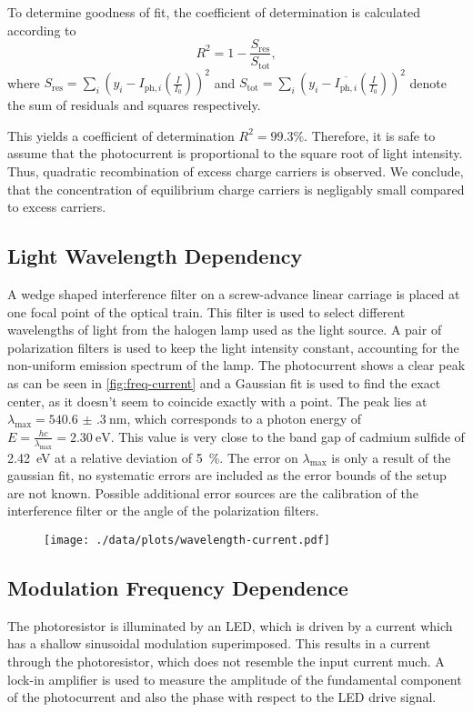 To determine goodness of fit, the coefficient of determination is calculated according to
\begin{equation*}
	R^2 = 1 - \frac{S_\text{res}}{S_\text{tot}},
\end{equation*}
where $S_\text{res}=\sum_i\left(y_i - I_{\text{ph},i}\left(\frac{I}{I_0}\right)\right)^2$ and $S_\text{tot}=\sum_i\left(y_i - \overline{I_{\text{ph},i}}\left(\frac{I}{I_0}\right)\right)^2$ denote the sum of residuals and squares respectively.

This yields a coefficient of determination $R^2 = 99.3\%$.
Therefore, it is safe to assume that the photocurrent is proportional to the square root of light intensity.
Thus, quadratic recombination of excess charge carriers is observed.
We conclude, that the concentration of equilibrium charge carriers is negligably small compared to excess carriers.

\subsection{Light Wavelength Dependency}
A wedge shaped interference filter on a screw-advance linear carriage is placed at one focal point of the optical train.
This filter is used to select different wavelengths of light from the halogen lamp used as the light source.
A pair of polarization filters is used to keep the light intensity constant, accounting for the non-uniform emission spectrum of the lamp.
The photocurrent shows a clear peak as can be seen in \autoref{fig:freq-current} and a Gaussian fit is used to find the exact center, as it doesn't seem to coincide exactly with a point.
The peak lies at $\lambda_\text{max} = \SI{540.6(3)}{\nano\meter}$, which corresponds to a photon energy of $E = \frac{h c}{\lambda_\text{max}} = \SI{2.30}{\electronvolt}$.
This value is very close to the band gap of cadmium sulfide of \SI{2.42}{\electronvolt} at a relative deviation of \SI{5}{\percent}.
The error on $\lambda_\text{max}$ is only a result of the gaussian fit, no systematic errors are included as the error bounds of the setup are not known.
Possible additional error sources are the calibration of the interference filter or the angle of the polarization filters.
\begin{figure}
	\centering
	\texttt{[image: ./data/plots/wavelength-current.pdf]}
	\label{fig:freq-current}
\end{figure}

\subsection{Modulation Frequency Dependence}
The photoresistor is illuminated by an LED, which is driven by a current which has a shallow sinusoidal modulation superimposed.
This results in a current through the photoresistor, which does not resemble the input current much.
A lock-in amplifier is used to measure the amplitude of the fundamental component of the photocurrent and also the phase with respect to the LED drive signal.

